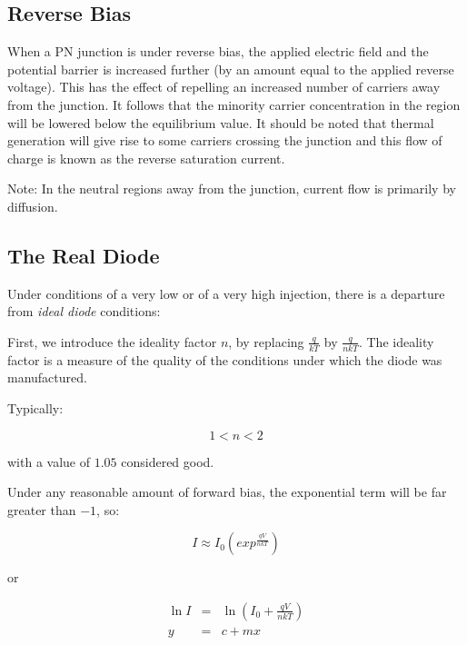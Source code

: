 \documentclass[a4paper,12pt]{article}
\begin{document}
\subsection{Reverse Bias}

When a PN junction is under reverse bias, the applied electric field and
the potential barrier is increased further (by an amount equal to the
applied reverse voltage). This has the effect of repelling an increased
number of carriers away from the junction. It follows that the minority
carrier concentration in the region will be lowered below the
equilibrium value. It should be noted that thermal generation will give
rise to some carriers crossing the junction and this flow of charge is
known as the reverse saturation current.

Note: In the neutral regions away from the junction, current
flow is primarily by diffusion.


\begin{table}[hbtp]


\end{table}

\subsection{The Real Diode}

Under conditions of a very low or of a very high injection, there is a
departure from \emph{ideal diode} conditions:

First, we introduce the ideality factor $n$, by replacing
$\frac{q}{kT}$ by $\frac{q}{nkT}$. The ideality factor is a measure of
the quality of the conditions under which the diode was manufactured.


Typically:

\[ 1 < n < 2 \]

with a value of $1.05$ considered good.

Under any reasonable amount of forward bias, the exponential
term will be far greater than $-1$, so:

\[ I \approx I_{0} \left( exp^{\frac{q V}{nkT}} \right) \]

or

\begin{eqnarray*}
\ln{I} & = & \ln{\left(I_{0} + \frac{q V}{nkT}\right)} \\
y & = & c + mx
\end{eqnarray*}
\end{document}
